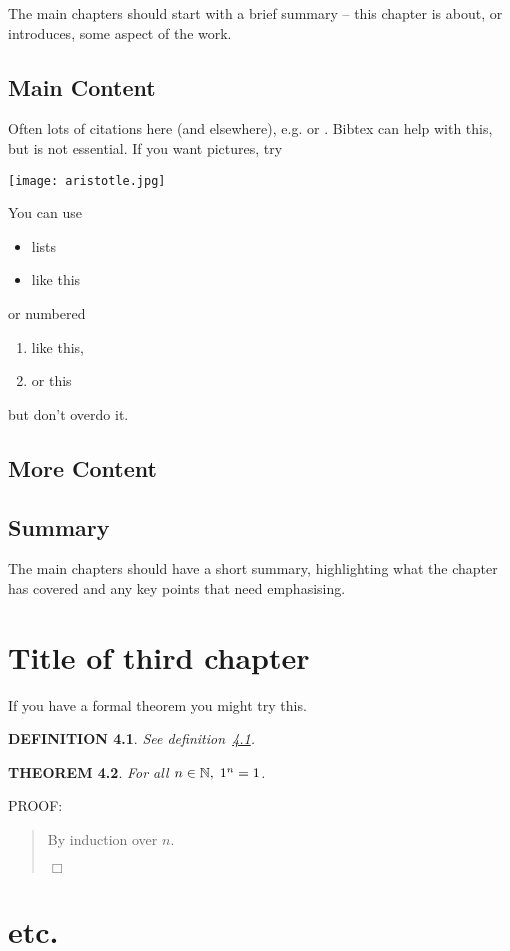 \documentclass[a4paper]{report}
\newtheorem{theorem}{THEOREM}
\newtheorem{definition}[theorem]{DEFINITION}
\newenvironment{proof}{
PROOF:
\begin{quotation}}{
$\Box$ \end{quotation}}
\newcommand{\nats}{\mbox{\( \mathbb N \)}}
\begin{document}
The main chapters should start with a brief summary -- this chapter is about, or introduces, some aspect of the work.

\section{Main Content}
Often lots of citations here (and elsewhere), e.g. \cite{Rey:D} or \cite[Theorem 2.3]{PriorNOP70}.   Bibtex can help with this, but is not essential. If you want pictures, try

\begin{center}
\texttt{[image: aristotle.jpg]}
\end{center}
You can use 
\begin{itemize}
\item lists
\item like this
\end{itemize}
or numbered
\begin{enumerate}
\item like this,
\item or this
\end{enumerate}
but don't overdo it.

\section{More Content}

\section{Summary}
The main chapters should have a short summary, highlighting what the chapter has covered and any key points that need emphasising.

\chapter{Title of third chapter}
If you have a formal theorem you might try this.
\begin{definition}\label{def}
See definition~\ref{def}.
\end{definition}
\begin{theorem}
For all $n\in\nats,\; 1^n=1$.
\end{theorem}
\begin{proof}
By induction over $n$.
\end{proof}

\chapter{etc.}
\end{document}
